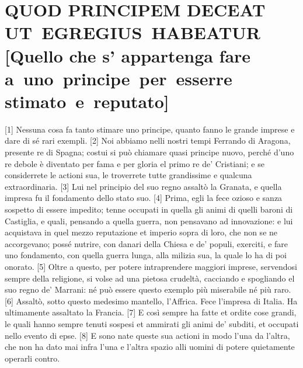 \quebra\section{QUOD PRINCIPEM DECEAT UT~EGREGIUS~HABEATUR\break
{[}Quello che s' appartenga fare a~uno~principe~per~esserre stimato~e~reputato{]}}

{[}1{]} Nessuna cosa fa tanto stimare uno principe, quanto fanno le
grande imprese e dare di sé rari exempli. {[}2{]} Noi abbiamo nelli
nostri tempi Ferrando di Aragona, presente re di Spagna; costui si può
chiamare quasi principe nuovo, perché d'uno re debole è diventato per
fama e per gloria el primo re de' Cristiani; e se considerrete le
actioni sua, le troverrete tutte grandissime e qualcuna extraordinaria.
{[}3{]} Lui nel principio del suo regno assaltò la Granata, e quella
impresa fu il fondamento dello stato suo. {[}4{]} Prima, egli la fece
ozioso e sanza sospetto di essere impedito; tenne occupati in quella gli
animi di quelli baroni di Castiglia, e quali, pensando a quella guerra,
non pensavano ad innovazione: e lui acquistava in quel mezzo reputazione
et imperio sopra di loro, che non se ne accorgevano; possé nutrire, con
danari della Chiesa e de' populi, exerciti, e fare uno fondamento, con
quella guerra lunga, alla milizia sua, la quale lo ha di poi onorato.
{[}5{]} Oltre a questo, per potere intraprendere maggiori imprese,
servendosi sempre della religione, si volse ad una pietosa crudeltà,
cacciando e spogliando el suo regno de' Marrani: né può essere questo
exemplo più miserabile né più raro. {[}6{]} Assaltò, sotto questo
medesimo mantello, l'Affrica. Fece l'impresa di Italia. Ha ultimamente
assaltato la Francia. {[}7{]} E così sempre ha fatte et ordite cose
grandi, le quali hanno sempre tenuti sospesi et ammirati gli animi de'
subditi, et occupati nello evento di epse. {[}8{]} E sono nate queste
sua actioni in modo l'una da l'altra, che non ha dato mai infra l'una e
l'altra spazio alli uomini di potere quietamente operarli contro.


